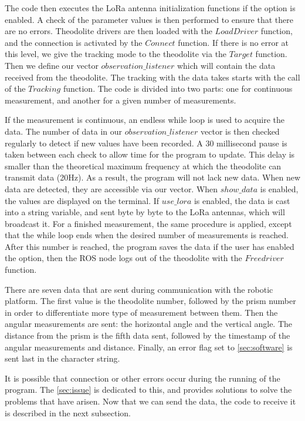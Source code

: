 \documentclass[10pt,letterpaper,oneside]{article}
\begin{document}
The code then executes the LoRa antenna initialization functions if the option is enabled.
A check of the parameter values is then performed to ensure that there are no errors.
Theodolite drivers are then loaded with the $LoadDriver$ function, and the connection is activated by the $Connect$ function.
If there is no error at this level, we give the tracking mode to the theodolite via the $Target$ function.
Then we define our vector $observation\_listener$ which will contain the data received from the theodolite.
The tracking with the data takes starts with the call of the $Tracking$ function.
The code is divided into two parts: one for continuous measurement, and another for a given number of measurements.

If the measurement is continuous, an endless while loop is used to acquire the data.
The number of data in our $observation\_listener$ vector is then checked regularly to detect if new values have been recorded.
A 30 millisecond pause is taken between each check to allow time for the program to update.
This delay is smaller than the theoretical maximum frequency at which the theodolite can transmit data (20Hz).
As a result, the program will not lack new data.
When new data are detected, they are accessible via our vector.
When $show\_data$ is enabled, the values are displayed on the terminal.
If $use\_lora$ is enabled, the data is cast into a string variable, and sent byte by byte to the LoRa antennas, which will broadcast it.
For a finished measurement, the same procedure is applied, except that the while loop ends when the desired number of measurements is reached.
After this number is reached, the program saves the data if the user has enabled the option, then the ROS node logs out of the theodolite with the $Freedriver$ function.

There are seven data that are sent during communication with the robotic platform.
The first value is the theodolite number, followed by the prism number in order to differentiate more type of measurement between them.
Then the angular measurements are sent: the horizontal angle and the vertical angle.
The distance from the prism is the fifth data sent, followed by the timestamp of the angular measurements and distance.
Finally, an error flag set to \autoref{sec:software} is sent last in the character string.

It is possible that connection or other errors occur during the running of the program.
The \autoref{sec:issue} is dedicated to this, and provides solutions to solve the problems that have arisen.
Now that we can send the data, the code to receive it is described in the next subsection.
\end{document}
